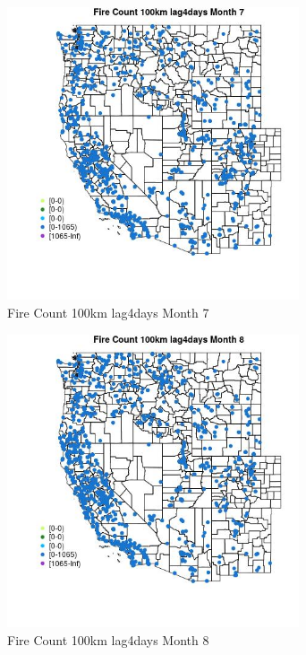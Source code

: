 \begin{figure} 
\centering  
\includegraphics[width=0.77\textwidth]{Code_Outputs/Report_ML_input_PM25_Step4_part_f_de_duplicated_aveswNAs_MapObsMo7Fire_Count_100km_lag4days.jpg} 
\caption{\label{fig:Report_ML_input_PM25_Step4_part_f_de_duplicated_aveswNAsMapObsMo7Fire_Count_100km_lag4days}Fire Count 100km lag4days Month 7} 
\end{figure} 
 

\begin{figure} 
\centering  
\includegraphics[width=0.77\textwidth]{Code_Outputs/Report_ML_input_PM25_Step4_part_f_de_duplicated_aveswNAs_MapObsMo8Fire_Count_100km_lag4days.jpg} 
\caption{\label{fig:Report_ML_input_PM25_Step4_part_f_de_duplicated_aveswNAsMapObsMo8Fire_Count_100km_lag4days}Fire Count 100km lag4days Month 8} 
\end{figure} 
 

